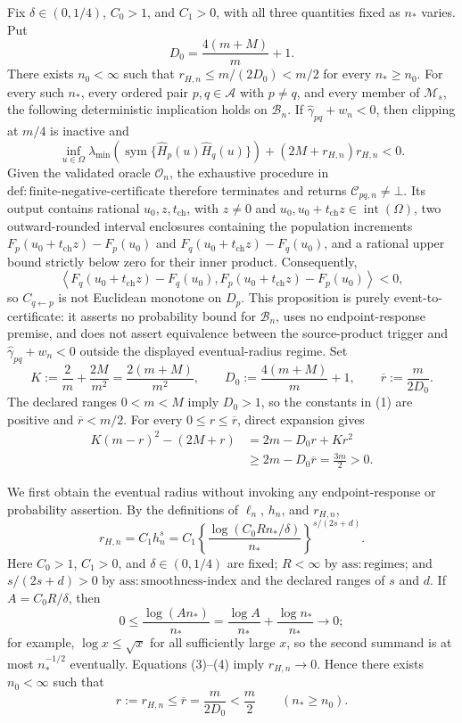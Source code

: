 Fix \(\delta\in(0,1/4)\), \(C_0>1\), and \(C_1>0\), with all three quantities fixed as \(n_\ast\) varies.  Put
\[
 D_0=\frac{4(m+M)}{m}+1.
\]
There exists \(n_0<\infty\) such that \(r_{H,n}\le m/(2D_0)<m/2\) for every \(n_\ast\ge n_0\).  For every such \(n_\ast\), every ordered pair \(p,q\in\mathcal A\) with \(p\ne q\), and every member of \(\mathcal M_s\), the following deterministic implication holds on \(\mathcal B_n\).  If \(\widehat\gamma_{pq}+w_n<0\), then clipping at \(m/4\) is inactive and
\[
 \inf_{u\in\Omega}\lambda_{\min}\!\left(
 \operatorname{sym}\{\widehat H_p(u)\widehat H_q(u)\}\right)
 +(2M+r_{H,n})r_{H,n}<0.
\]
Given the validated oracle \(\mathcal O_n\), the exhaustive procedure in \(\mathrm{def:finite\text{-}negative\text{-}certificate}\) therefore terminates and returns \(\mathcal C_{pq,n}\ne\bot\).  Its output contains rational \(u_0,z,t_{\mathrm{ch}}\), with \(z\ne0\) and \(u_0,u_0+t_{\mathrm{ch}}z\in\operatorname{int}(\Omega)\), two outward-rounded interval enclosures containing the population increments \(F_p(u_0+t_{\mathrm{ch}}z)-F_p(u_0)\) and \(F_q(u_0+t_{\mathrm{ch}}z)-F_q(u_0)\), and a rational upper bound strictly below zero for their inner product.  Consequently,
\[
 \left\langle F_q(u_0+t_{\mathrm{ch}}z)-F_q(u_0),
 F_p(u_0+t_{\mathrm{ch}}z)-F_p(u_0)\right\rangle<0,
\]
so \(C_{q\leftarrow p}\) is not Euclidean monotone on \(D_p\).  This proposition is purely event-to-certificate: it asserts no probability bound for \(\mathcal B_n\), uses no endpoint-response premise, and does not assert equivalence between the source-product trigger and \(\widehat\gamma_{pq}+w_n<0\) outside the displayed eventual-radius regime.
Set
\[
 K:=\frac{2}{m}+\frac{2M}{m^2}=\frac{2(m+M)}{m^2},
 \qquad
 D_0:=\frac{4(m+M)}{m}+1,
 \qquad
 \overline r:=\frac{m}{2D_0}.
 \tag{1}
\]
The declared ranges \(0<m<M\) imply \(D_0>1\), so the constants in (1) are positive and \(\overline r<m/2\).  For every \(0\le r\le\overline r\), direct expansion gives
\[
 \begin{aligned}
 K(m-r)^2-(2M+r)
 &=2m-D_0r+Kr^2\\
 &\ge 2m-D_0\overline r
 =\frac{3m}{2}>0.
 \end{aligned}
 \tag{2}
\]

We first obtain the eventual radius without invoking any endpoint-response or probability assertion.  By the definitions of \(\ell_n\), \(h_n\), and \(r_{H,n}\),
\[
 r_{H,n}=C_1h_n^s
 =C_1\left\{\frac{\log(C_0Rn_\ast/\delta)}{n_\ast}\right\}^{s/(2s+d)}.
 \tag{3}
\]
Here \(C_0>1\), \(C_1>0\), and \(\delta\in(0,1/4)\) are fixed; \(R<\infty\) by \(\mathrm{ass:regimes}\); and \(s/(2s+d)>0\) by \(\mathrm{ass:smoothness\text{-}index}\) and the declared ranges of \(s\) and \(d\).  If \(A=C_0R/\delta\), then
\[
 0\le \frac{\log(An_\ast)}{n_\ast}
 =\frac{\log A}{n_\ast}+\frac{\log n_\ast}{n_\ast}
 \longrightarrow0;
 \tag{4}
\]
for example, \(\log x\le\sqrt{x}\) for all sufficiently large \(x\), so the second summand is at most \(n_\ast^{-1/2}\) eventually.  Equations (3)--(4) imply \(r_{H,n}\to0\).  Hence there exists \(n_0<\infty\) such that
\[
 r:=r_{H,n}\le\overline r=\frac{m}{2D_0}<\frac m2
 \qquad(n_\ast\ge n_0).
 \tag{5}
\]


